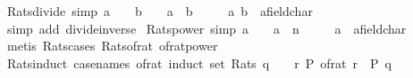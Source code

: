\begin{isabellebody}
\endisatagproof
{\isafoldproof}%
%
\isadelimproof
\isanewline
%
\endisadelimproof
\isanewline
{}\isamarkupfalse%
\ Rats{\isacharunderscore}{\kern0pt}divide\ {\isacharbrackleft}{\kern0pt}simp{\isacharbrackright}{\kern0pt}{\isacharcolon}{\kern0pt}\ {\isachardoublequoteopen}a\ {\isasymin}\ {\isasymrat}\ {\isasymLongrightarrow}\ b\ {\isasymin}\ {\isasymrat}\ {\isasymLongrightarrow}\ a\ {\isacharslash}{\kern0pt}\ b\ {\isasymin}\ {\isasymrat}{\isachardoublequoteclose}\isanewline
\ \ \ a\ b\ {\isacharcolon}{\kern0pt}{\isacharcolon}{\kern0pt}\ {\isachardoublequoteopen}{\isacharprime}{\kern0pt}a{\isacharcolon}{\kern0pt}{\isacharcolon}{\kern0pt}field{\isacharunderscore}{\kern0pt}char{\isacharunderscore}{\kern0pt}{}{\isachardoublequoteclose}\isanewline
%
\isadelimproof
\ \ %
\endisadelimproof
%
\isatagproof
{}\isamarkupfalse%
\ {\isacharparenleft}{\kern0pt}simp\ add{\isacharcolon}{\kern0pt}\ divide{\isacharunderscore}{\kern0pt}inverse{\isacharparenright}{\kern0pt}%
\endisatagproof
{\isafoldproof}%
%
\isadelimproof
\isanewline
%
\endisadelimproof
\isanewline
{}\isamarkupfalse%
\ Rats{\isacharunderscore}{\kern0pt}power\ {\isacharbrackleft}{\kern0pt}simp{\isacharbrackright}{\kern0pt}{\isacharcolon}{\kern0pt}\ {\isachardoublequoteopen}a\ {\isasymin}\ {\isasymrat}\ {\isasymLongrightarrow}\ a\ {\isacharcircum}{\kern0pt}\ n\ {\isasymin}\ {\isasymrat}{\isachardoublequoteclose}\isanewline
\ \ \ a\ {\isacharcolon}{\kern0pt}{\isacharcolon}{\kern0pt}\ {\isachardoublequoteopen}{\isacharprime}{\kern0pt}a{\isacharcolon}{\kern0pt}{\isacharcolon}{\kern0pt}field{\isacharunderscore}{\kern0pt}char{\isacharunderscore}{\kern0pt}{}{\isachardoublequoteclose}\isanewline
%
\isadelimproof
\ \ %
\endisadelimproof
%
\isatagproof
{}\isamarkupfalse%
\ {\isacharparenleft}{\kern0pt}metis\ Rats{\isacharunderscore}{\kern0pt}cases\ Rats{\isacharunderscore}{\kern0pt}of{\isacharunderscore}{\kern0pt}rat\ of{\isacharunderscore}{\kern0pt}rat{\isacharunderscore}{\kern0pt}power{\isacharparenright}{\kern0pt}%
\endisatagproof
{\isafoldproof}%
%
\isadelimproof
\isanewline
%
\endisadelimproof
\isanewline
{}\isamarkupfalse%
\ Rats{\isacharunderscore}{\kern0pt}induct\ {\isacharbrackleft}{\kern0pt}case{\isacharunderscore}{\kern0pt}names\ of{\isacharunderscore}{\kern0pt}rat{\isacharcomma}{\kern0pt}\ induct\ set{\isacharcolon}{\kern0pt}\ Rats{\isacharbrackright}{\kern0pt}{\isacharcolon}{\kern0pt}\ {\isachardoublequoteopen}q\ {\isasymin}\ {\isasymrat}\ {\isasymLongrightarrow}\ {\isacharparenleft}{\kern0pt}{\isasymAnd}r{\isachardot}{\kern0pt}\ P\ {\isacharparenleft}{\kern0pt}of{\isacharunderscore}{\kern0pt}rat\ r{\isacharparenright}{\kern0pt}{\isacharparenright}{\kern0pt}\ {\isasymLongrightarrow}\ P\ q{\isachardoublequoteclose}\isanewline

\end{isabellebody}
